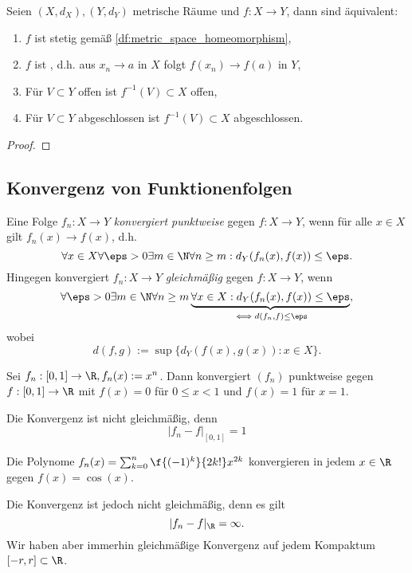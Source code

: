 \begin{st}
	Seien $(X, d_X), (Y, d_Y)$ metrische Räume und $f: X \to Y$, dann sind äquivalent:
	\begin{enumerate}[1)]
		\item
			$f$ ist stetig gemäß \ref{df:metric_space_homeomorphism},
		\item
			$f$ ist , d.h. aus $x_n \to a$ in $X$ folgt $f(x_n) \to f(a)$ in $Y$,
		\item
			Für $V \subset Y$ offen ist $f^{-1}(V) \subset X$ offen,
		\item
			Für $V \subset Y$ abgeschlossen ist $f^{-1}(V) \subset X$ abgeschlossen.
	\end{enumerate}
	\begin{proof}
	\end{proof}
\end{st}

\subsection{Konvergenz von Funktionenfolgen}

\begin{df}
	Eine Folge $f_n: X \to Y$ \emph{konvergiert punktweise} gegen $f: X \to Y$, wenn für alle $x \in X$ gilt $f_n(x) \to f(x)$, d.h.
	\[
		\forall x \in X \forall \eps > 0 \exists m \in \N \forall n \ge m : d_Y(f_n(x), f(x)) \le \eps.
	\]
	Hingegen konvergiert $f_n: X \to Y$ \emph{gleichmäßig} gegen $f: X \to Y$, wenn
	\[
		\forall \eps > 0 \exists m \in \N \forall n \ge m \underbrace{\forall x \in X : d_Y(f_n(x), f(x)) \le \eps}_{\iff d (f_n, f) \le \eps},
	\]
	wobei
	\[
		d(f,g)
		:= \sup \{ d_Y(f(x), g(x)) : x \in X \}.
	\]
\end{df}

\begin{ex}
	Sei $f_n : [0,1] \to \R, f_n(x) := x^n$.
	Dann konvergiert $(f_n)$ punktweise gegen $f:[0,1] \to \R$ mit $f(x) = 0$ für $0 \le x < 1$ und $f(x) = 1$ für $x=1$.

	Die Konvergenz ist nicht gleichmäßig, denn
	\[
		|f_n - f|_{[0,1]} = 1
	\]
\end{ex}

\begin{ex}
	Die Polynome $f_n(x) = \sum_{k=0}^n \f{(-1)^k}{2k!} x^{2k}$ konvergieren in jedem $x \in \R$ gegen $f(x) = \cos(x)$.

	Die Konvergenz ist jedoch nicht gleichmäßig, denn es gilt
	\[
		|f_n - f|_{\R} = \infty.
	\]
	Wir haben aber immerhin gleichmäßige Konvergenz auf jedem Kompaktum $[-r,r] \subset \R$.
\end{ex}

